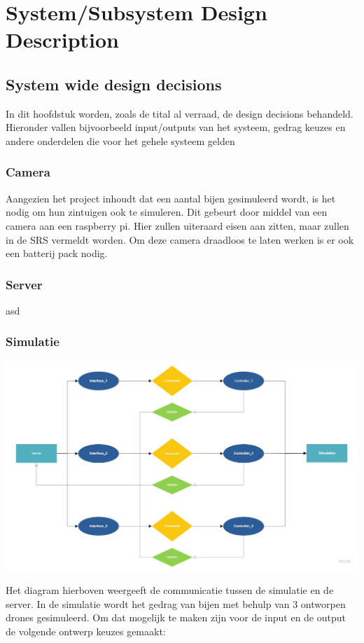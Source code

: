\section{System/Subsystem Design Description}



\subsection{System wide design decisions}
In dit hoofdstuk worden, zoals de tital al verraad, de design decisions behandeld. Hieronder vallen bijvoorbeeld
input/outputs van het systeem, gedrag keuzes en andere onderdelen die voor het gehele systeem gelden


\subsubsection*{Camera}
Aangezien het project inhoudt dat een aantal bijen gesimuleerd wordt, is het nodig om hun zintuigen ook te simuleren. Dit gebeurt door middel van een camera aan een raspberry pi. Hier zullen uiteraard eisen aan zitten, maar zullen in de SRS vermeldt worden. Om deze camera draadloos te laten werken is er ook een batterij pack nodig.

\subsubsection*{Server}
asd
\newline

\subsubsection*{Simulatie}
    \begin{center}
    \hspace*{-3.5cm}\includegraphics[width=1.6\textwidth]{../IMAGES/Simulation Interaction.jpg}
    \end{center}
    Het diagram hierboven weergeeft de communicatie tussen de simulatie en de server. In de simulatie
    wordt het gedrag van bijen met behulp van 3 ontworpen drones gesimuleerd. Om dat mogelijk te maken
    zijn voor de input en de output de volgende ontwerp keuzes gemaakt: \\

